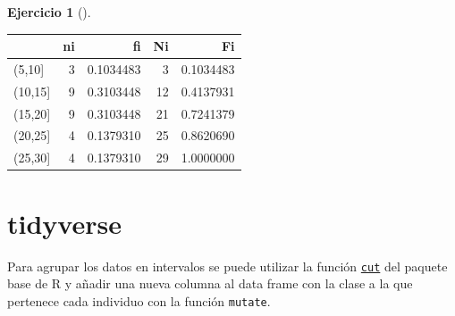 \documentclass[
  spanish,
  a4paper,
]{scrreport}
\newenvironment{Shaded}{\begin{snugshade}}{\end{snugshade}}
\newcommand{\AttributeTok}[1]{\textcolor[rgb]{0.40,0.45,0.13}{#1}}
\newcommand{\CommentTok}[1]{\textcolor[rgb]{0.37,0.37,0.37}{#1}}
\newcommand{\DecValTok}[1]{\textcolor[rgb]{0.68,0.00,0.00}{#1}}
\newcommand{\FunctionTok}[1]{\textcolor[rgb]{0.28,0.35,0.67}{#1}}
\newcommand{\NormalTok}[1]{\textcolor[rgb]{0.00,0.23,0.31}{#1}}
\newcommand{\OtherTok}[1]{\textcolor[rgb]{0.00,0.23,0.31}{#1}}
\newcommand{\SpecialCharTok}[1]{\textcolor[rgb]{0.37,0.37,0.37}{#1}}
\theoremstyle{definition}
\newtheorem{exercise}{Ejercicio}[chapter]
\theoremstyle{remark}
\begin{document}
\begin{exercise}[]
\begin{enumerate}
\begin{tcolorbox}
\begin{Shaded}
\end{Shaded}

  \begin{longtable}[]{@{}lrrrr@{}}
  \toprule\noalign{}
  & ni & fi & Ni & Fi \\
  \midrule\noalign{}
  \endhead
  \bottomrule\noalign{}
  \endlastfoot
  (5,10{]} & 3 & 0.1034483 & 3 & 0.1034483 \\
  (10,15{]} & 9 & 0.3103448 & 12 & 0.4137931 \\
  (15,20{]} & 9 & 0.3103448 & 21 & 0.7241379 \\
  (20,25{]} & 4 & 0.1379310 & 25 & 0.8620690 \\
  (25,30{]} & 4 & 0.1379310 & 29 & 1.0000000 \\
  \end{longtable}

  \section{tidyverse}

  Para agrupar los datos en intervalos se puede utilizar la función
  \href{https://www.rdocumentation.org/packages/base/versions/3.6.2/topics/cut}{\texttt{cut}}
  del paquete base de R y añadir una nueva columna al data frame con la
  clase a la que pertenece cada individuo con la función
  \texttt{mutate}.


\end{tcolorbox}
\end{enumerate}
\end{exercise}
\end{document}
